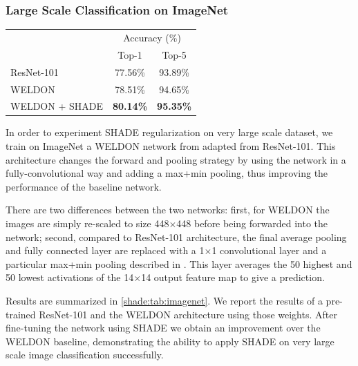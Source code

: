             
    \subsubsection{Large Scale Classification on ImageNet}
    \label{shade:imagenetExperiment}

        \begin{table}[t]
            \centering
            \begin{tabular}{lcc}
            \toprule
                                & \multicolumn{2}{c}{Accuracy (\%)} \\
                                & Top-1   & Top-5   \\
            \midrule
            ResNet-101       & 77.56\% & 93.89\% \\
            WELDON           & 78.51\% & 94.65\% \\
            WELDON + SHADE   & \bfseries 80.14\% & \bfseries  95.35\% \\
            \bottomrule
            \end{tabular}

        \label{shade:tab:imagenet}
        \end{table}

        In order to experiment \ac{SHADE} regularization on very large scale dataset, we train on ImageNet \citep{imagenet} a WELDON network from \citet{weldone} adapted from ResNet-101. This architecture changes the forward and pooling strategy by using the network in a fully-convolutional way and adding a max+min pooling, thus improving the performance of the baseline network.
        
        There are two differences between the two networks: first, for WELDON the images are simply re-scaled to size 448$\times$448 before being forwarded into the network; second, compared to ResNet-101 architecture, the final average pooling and fully connected layer are replaced with a 1$\times$1 convolutional layer and a particular max+min pooling described in \citet{weldone}. This layer averages the 50 highest and 50 lowest activations of the 14$\times$14 output feature map to give a prediction.

        Results are summarized in \autoref{shade:tab:imagenet}. We report the results of a pre-trained ResNet-101 and the WELDON architecture using those weights. After fine-tuning the network using \ac{SHADE} we obtain an improvement over the WELDON baseline, demonstrating the ability to apply \ac{SHADE} on very large scale image classification successfully. 
    
